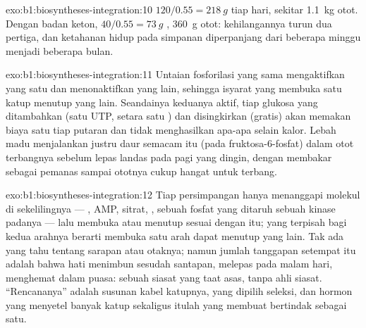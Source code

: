 \begin{solution}{exo:b1:biosyntheses-integration:10}
$120/0.55 = \qty{218}{g}$  tiap hari, sekitar \qty{1.1}{kg} otot.
Dengan badan keton, $40/0.55 = \qty{73}{g}$ , \qty{360}{g} otot:
kehilangannya turun dua pertiga, dan ketahanan hidup pada simpanan
 diperpanjang dari beberapa minggu menjadi beberapa bulan.
\end{solution}

\begin{solution}{exo:b1:biosyntheses-integration:11}
Untaian fosforilasi yang sama mengaktifkan yang satu dan menonaktifkan
yang lain, sehingga isyarat yang membuka satu katup menutup yang lain.
Seandainya keduanya aktif, tiap glukosa yang ditambahkan (satu UTP,
setara satu ) dan disingkirkan (gratis) akan memakan biaya satu 
tiap putaran dan tidak menghasilkan apa-apa selain kalor. Lebah madu
menjalankan justru daur semacam itu (pada fruktosa-6-fosfat) dalam otot
terbangnya sebelum lepas landas pada pagi yang dingin, dengan membakar
 sebagai pemanas sampai ototnya cukup hangat untuk terbang.
\end{solution}

\begin{solution}{exo:b1:biosyntheses-integration:12}
Tiap  persimpangan hanya menanggapi molekul di sekelilingnya ---
, AMP, sitrat, , sebuah fosfat yang ditaruh sebuah kinase
padanya --- lalu membuka atau menutup sesuai dengan itu;  yang
terpisah bagi kedua arahnya berarti membuka satu arah dapat menutup
yang lain. Tak ada  yang tahu tentang sarapan atau otaknya; namun
jumlah tanggapan setempat itu adalah bahwa hati menimbun sesudah
santapan, melepas pada malam hari, menghemat  dalam puasa:
sebuah siasat yang taat asas, tanpa ahli siasat. ``Rencananya'' adalah
susunan kabel katupnya, yang dipilih seleksi, dan hormon yang menyetel
banyak katup sekaligus itulah yang membuat  bertindak
sebagai satu.
\end{solution}

